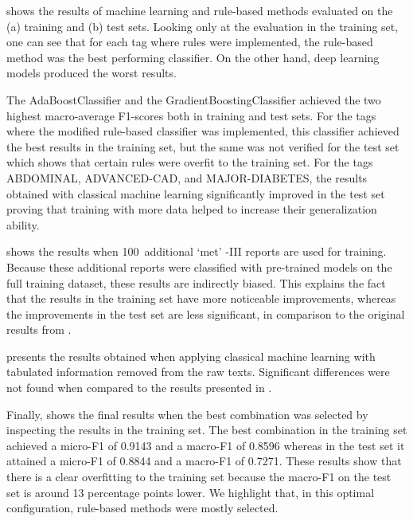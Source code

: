  shows the results of machine learning and rule-based methods evaluated on the (a) training and (b) test sets.
Looking only at the evaluation in the training set, one can see that for each tag where rules were implemented, the rule-based method was the best performing classifier.
On the other hand, deep learning models produced the worst results.



The \textsf{AdaBoostClassifier} and the \textsf{GradientBoostingClassifier} achieved the two highest macro-average F1-scores both in training and test sets.
For the tags where the modified rule-based classifier was implemented, this classifier achieved the best results in the training set, but the same was not verified for the test set which shows that certain rules were overfit to the training set.
For the tags \textsf{ABDOMINAL}, \textsf{ADVANCED-CAD}, and \textsf{MAJOR-DIABETES}, the results obtained with classical machine learning significantly improved in the test set proving that training with more data helped to increase their generalization ability.



 shows the results when 100~additional `met' -III reports are used for training.
Because these additional reports were classified with pre-trained models on the full training dataset, these results are indirectly biased.
This explains the fact that the results in the training set have more noticeable improvements, whereas the improvements in the test set are less significant, in comparison to the original results from .

 presents the results obtained when applying classical machine learning with tabulated information removed from the raw texts. Significant differences were not found when compared to the results presented in .

Finally,  shows the final results when the best combination was selected by inspecting the results in the training set.
The best combination in the training set achieved a micro-F1 of 0.9143 and a macro-F1 of 0.8596 whereas in the test set it attained a micro-F1 of 0.8844 and a macro-F1 of 0.7271.
These results show that there is a clear overfitting to the training set because the macro-F1 on the test set is around 13 percentage points lower.
We highlight that, in this optimal configuration, rule-based methods were mostly selected.

